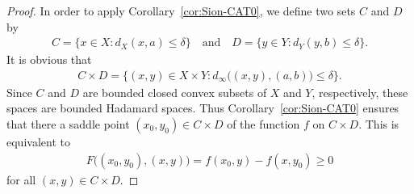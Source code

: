\documentclass[draft]{amsart}
\numberwithin{equation}{section}
\theoremstyle{plain}
\theoremstyle{definition}
\theoremstyle{remark}
\begin{document}
\begin{proof}
 In order to apply Corollary~\ref{cor:Sion-CAT0}, 
 we define two sets $C$ and $D$ by 
 \begin{align}
  C=\{x\in X:d_X(x,a)\leq \delta\}
 \quad \textrm{and} \quad 
  D=\{y\in Y: d_Y(y,b)\leq \delta\}. 
 \end{align}
 It is obvious that 
 \begin{align}
  C\times D = \{(x,y)\in X\times Y: d_{\infty}
 \bigl((x,y), (a,b)\bigr) \leq \delta\}. 
 \end{align}
 Since $C$ and $D$ are bounded closed convex subsets of 
 $X$ and $Y$, respectively, these spaces are bounded Hadamard spaces. 
 Thus Corollary~\ref{cor:Sion-CAT0} ensures that 
 there a saddle point $(x_0, y_0) \in C\times D$ 
 of the function $f$ on $C\times D$. 
 This is equivalent to 
 \begin{align}\label{eq:thm:minimax-coercive-a}
  F\bigl((x_0,y_0), (x,y)\bigr) 
 = f(x_0, y) - f(x, y_0) \geq 0
 \end{align}
 for all $(x,y) \in C\times D$. 


\end{proof}
\end{document}
